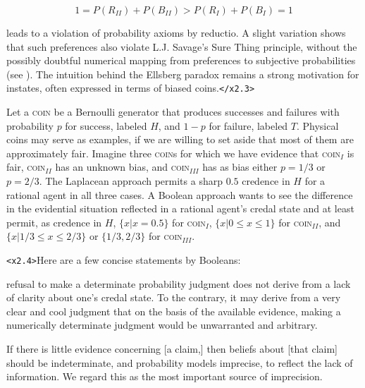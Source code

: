 \documentclass[11pt]{article}
\begin{document}
\begin{equation}
  \label{eq:s1}
  1=P(R_{II})+P(B_{II})>P(R_{I})+P(B_{I})=1
\end{equation}

leads to a violation of probability axioms by reductio. A slight variation shows that such preferences also violate L.J. Savage's Sure Thing principle, without the possibly doubtful numerical mapping from preferences to subjective probabilities (see ). The intuition behind the Ellsberg paradox remains a strong motivation for instates, often expressed in terms of biased coins.\texttt{</x2.3>}

Let a \textsc{coin} be a Bernoulli generator that produces successes and failures with probability $p$ for success, labeled $H$, and $1-p$ for failure, labeled $T$. Physical coins may serve as examples, if we are willing to set aside that most of them are approximately fair. Imagine three \textsc{coin}s for which we have evidence that \textsc{coin}$_{I}$ is fair, \textsc{coin}$_{II}$ has an unknown bias, and \textsc{coin}$_{III}$ has as bias either $p=1/3$ or $p=2/3$. The Laplacean approach permits a sharp $0.5$ credence in $H$ for a rational agent in all three cases. A Boolean approach wants to see the difference in the evidential situation reflected in a rational agent's credal state and at least permit, as credence in $H$, $\{x|x=0.5\}$ for \textsc{coin}$_{I}$, $\{x|0\leq{}x\leq{}1\}$ for \textsc{coin}$_{II}$, and $\{x|1/3\leq{}x\leq{}2/3\}$ or $\{1/3,2/3\}$ for \textsc{coin}$_{III}$. 

\texttt{<x2.4>}Here are a few concise statements by Booleans:

\begin{quotex}
  [A] refusal to make a determinate probability judgment does not derive from a lack of clarity about one's credal state. To the contrary, it may derive from a very clear and cool judgment that on the basis of the available evidence, making a numerically determinate judgment would be unwarranted and arbitrary. 
\end{quotex}

\begin{quotex}
  If there is little evidence concerning [a claim,] then beliefs about [that claim] should be indeterminate, and probability models imprecise, to reflect the lack of information. We regard this as the most important source of imprecision. 
\end{quotex}
\end{document}

